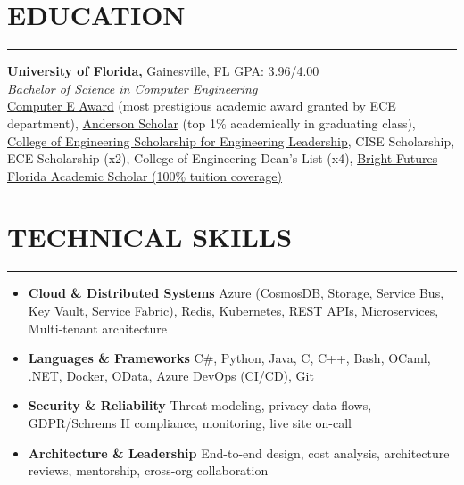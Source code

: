 \documentclass[11pt]{article}
\begin{document}
\section*{EDUCATION}
\hrule
\vspace{0.3cm}
\noindent
\textbf{University of Florida,} Gainesville, FL \hfill{GPA: 3.96/4.00}\\
\textit{Bachelor of Science in Computer Engineering}\\
    \href{https://www.ece.ufl.edu/people/student-awards/}
            {Computer E Award} (most prestigious academic award granted by ECE department),
    \href{https://clas.ufl.edu/undergraduate/anderson-scholars/}
            {Anderson Scholar} (top 1\% academically in graduating class),
    \href{https://www.eng.ufl.edu/leadership/students/scholarships/thomas-o-hunter-leadership/}
            {College of Engineering Scholarship for Engineering Leadership},
    CISE Scholarship,
    ECE Scholarship (x2),
    College of Engineering Dean\rq s List (x4),
    \href{https://en.wikipedia.org/wiki/Bright_Futures_Scholarship_Program}{Bright Futures Florida Academic Scholar (100\% tuition coverage)}

\vspace{0.6cm}
\section*{TECHNICAL SKILLS}
\hrule
\vspace{0.3cm}

\begin{itemize}[noitemsep,nolistsep,label={}]
    \item \textbf{Cloud \& Distributed Systems}
          Azure (CosmosDB, Storage, Service Bus, Key Vault, Service Fabric), 
          Redis, Kubernetes, REST APIs, Microservices, Multi-tenant architecture

    \item \textbf{Languages \& Frameworks}
          C\#, Python, Java, C, C++, Bash, OCaml, .NET, 
          Docker, OData, Azure DevOps (CI/CD), Git

    \item \textbf{Security \& Reliability}
          Threat modeling, privacy data flows, GDPR/Schrems II compliance, monitoring,
          live site on-call

    \item \textbf{Architecture \& Leadership}
          End-to-end design, cost analysis, architecture reviews,
          mentorship, cross-org collaboration

\end{itemize}
\end{document}
